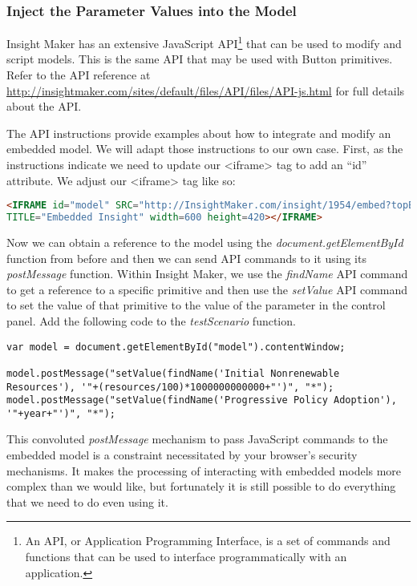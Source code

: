 \documentclass[]{memoir}
\begin{document}
\subsubsection{Inject the Parameter Values into the Model}

Insight Maker has an extensive JavaScript API\footnote{An API, or
  Application Programming Interface, is a set of commands and functions
  that can be used to interface programmatically with an application.}
that can be used to modify and script models. This is the same API that
may be used with Button primitives. Refer to the API reference at
\url{http://insightmaker.com/sites/default/files/API/files/API-js.html}
for full details about the API.

The API instructions provide examples about how to integrate and modify
an embedded model. We will adapt those instructions to our own case.
First, as the instructions indicate we need to update our
\textless{}iframe\textgreater{} tag to add an ``id'' attribute. We
adjust our \textless{}iframe\textgreater{} tag like so:

\begin{lstlisting}[language=HTML]
<IFRAME id="model" SRC="http://InsightMaker.com/insight/1954/embed?topBar=1&sideBar=1&zoom=1"
TITLE="Embedded Insight" width=600 height=420></IFRAME> 
\end{lstlisting}

Now we can obtain a reference to the model using the
\emph{document.getElementById} function from before and then we can send
API commands to it using its \emph{postMessage} function. Within Insight
Maker, we use the \emph{findName} API command to get a reference to a
specific primitive and then use the \emph{setValue} API command to set
the value of that primitive to the value of the parameter in the control
panel. Add the following code to the \emph{testScenario} function.

\begin{lstlisting}
var model = document.getElementById("model").contentWindow;

model.postMessage("setValue(findName('Initial Nonrenewable Resources'), '"+(resources/100)*1000000000000+"')", "*");
model.postMessage("setValue(findName('Progressive Policy Adoption'), '"+year+"')", "*");
\end{lstlisting}

This convoluted \emph{postMessage} mechanism to pass JavaScript commands
to the embedded model is a constraint necessitated by your browser's
security mechanisms. It makes the processing of interacting with
embedded models more complex than we would like, but fortunately it is
still possible to do everything that we need to do even using it.
\end{document}
